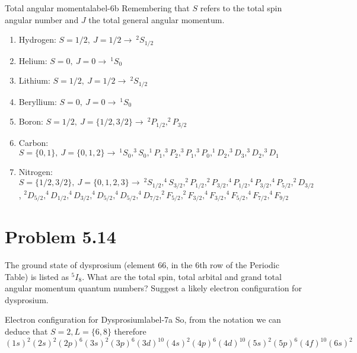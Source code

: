 \documentclass[../main.tex]{subfiles}
\begin{document}
\begin{sol}{Total angular momenta}{label-6b}
    Remembering that $S$ refers to the total spin angular number and $J$ the total general angular momentum.

    \begin{enumerate}
        \item Hydrogen: $S=1/2,~J=1/2\rightarrow~^{2}S_{1/2}$
        \item Helium: $S=0,~J=0\rightarrow~^{1}S_{0}$
        \item Lithium: $S=1/2,~J=1/2\rightarrow~^{2}S_{1/2}$
        \item Beryllium: $S=0,~J=0\rightarrow~^{1}S_{0}$
        \item Boron: $S=1/2,~J=\{1/2,3/2\}\rightarrow~^{2}P_{1/2},^{2}P_{3/2}$
        \item Carbon: $S=\{0,1\},~J=\{0,1,2\}\rightarrow~^{1}S_{0},^{3}S_{0},^{1}P_{1},^{3}P_{2},^{3}P_{1},^{3}P_{0},^{1}D_{2},^{3}D_{3},^{3}D_{2},^{3}D_{1}$ 
        \item Nitrogen: $S=\{1/2,3/2\},~J=\{0,1,2,3\}\rightarrow~^{2}S_{1/2},^{4}S_{3/2},^{2}P_{1/2},^{2}P_{3/2},^{4}P_{1/2},^{4}P_{3/2},^{4}P_{5/2},^{2}D_{3/2}$, $^{2}D_{5/2},^{4}D_{1/2},^{4}D_{3/2},^{4}D_{5/2},^{4}D_{5/2},^{4}D_{7/2},^2F_{5/2},^2F_{3/2},^4F_{3/2},^4F_{5/2},^4F_{7/2},^4F_{9/2}$ 
    \end{enumerate}

\end{sol}


\section{Problem 5.14}

The ground state of dysprosium (element 66, in the 6th row of the Periodic Table) is listed as $^5I_8$.
What are the total spin, total arbital and grand total angular momentum quantum numbers?
Suggest a likely electron configuration for dysprosium.

\begin{sol}{Electron configuration for Dysprosium}{label-7a}
    So, from the notation we can deduce that $S=2,L=\{6,8\}$ therefore \[(1s)^2(2s)^2(2p)^6(3s)^2(3p)^6(3d)^{10}(4s)^2(4p)^6(4d)^{10}(5s)^2(5p)^6(4f)^{10}(6s)^2\]

\end{sol}
\end{document}
